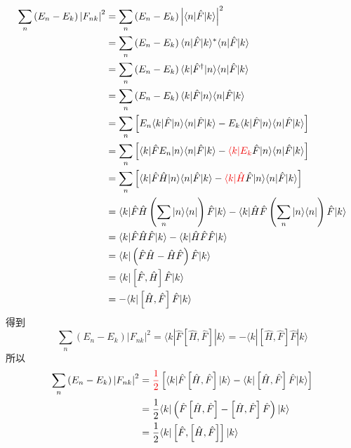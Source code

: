 \begin{equation}
    \begin{aligned}
        \sum_n{\left( E_n-E_k \right) \left| F_{nk} \right|^2}&=\sum_n{\left( E_n-E_k \right) \left| \langle n|\hat{F}|k\rangle \right|^2}
\\
&=\sum_n{\left( E_n-E_k \right) \langle n|\hat{F}|k\rangle ^*\langle n|\hat{F}|k\rangle}
\\
&=\sum_n{\left( E_n-E_k \right) \langle k|\hat{F}^{\dagger}|n\rangle \langle n|\hat{F}|k\rangle}
\\
&=\sum_n{\left( E_n-E_k \right) \langle k|\hat{F}|n\rangle \langle n|\hat{F}|k\rangle}
\\
&=\sum_n{\left[ E_n\langle k|\hat{F}|n\rangle \langle n|\hat{F}|k\rangle -E_k\langle k|\hat{F}|n\rangle \langle n|\hat{F}|k\rangle \right]}
\\
&=\sum_n{\left[ \langle k|\hat{F}E_n|n\rangle \langle n|\hat{F}|k\rangle -{\color[RGB]{240, 0, 0} \langle k|E_k}\hat{F}|n\rangle \langle n|\hat{F}|k\rangle \right]}
\\
&=\sum_n{\left[ \langle k|\hat{F}\hat{H}|n\rangle \langle n|\hat{F}|k\rangle -{\color[RGB]{240, 0, 0} \langle k|\hat{H}}\hat{F}|n\rangle \langle n|\hat{F}|k\rangle \right]}
\\
&=\langle k|\hat{F}\hat{H}\left( \sum_n{|n\rangle \langle n|} \right) \hat{F}|k\rangle -\langle k|\hat{H}\hat{F}\left( \sum_n{|n\rangle \langle n|} \right) \hat{F}|k\rangle
\\
&=\langle k|\hat{F}\hat{H}\hat{F}|k\rangle -\langle k|\hat{H}\hat{F}\hat{F}|k\rangle 
\\
&=\langle k|\left( \hat{F}\hat{H}-\hat{H}\hat{F} \right) \hat{F}|k\rangle 
\\
&=\langle k|\left[ \hat{F},\hat{H} \right] \hat{F}|k\rangle 
\\
&=-\langle k|\left[ \hat{H},\hat{F} \right] \hat{F}|k\rangle 
    \end{aligned}
\end{equation}
得到
\begin{equation}
    \sum_n{\left( E_n-E_k \right) \left| F_{nk} \right|^2}=\langle k|\hat{F}\left[ \hat{H},\hat{F} \right] |k\rangle =-\langle k|\left[ \hat{H},\hat{F} \right] \hat{F}|k\rangle 
\end{equation}
所以
\begin{equation}
    \begin{aligned}
        \sum_n{\left( E_n-E_k \right) \left| F_{nk} \right|^2}&={\color[RGB]{240, 0, 0} \frac{1}{2}}\left[ \langle k|\hat{F}\left[ \hat{H},\hat{F} \right] |k\rangle -\langle k|\left[ \hat{H},\hat{F} \right] \hat{F}|k\rangle \right] 
\\
&=\frac{1}{2}\langle k|\left( \hat{F}\left[ \hat{H},\hat{F} \right] -\left[ \hat{H},\hat{F} \right] \hat{F} \right) |k\rangle 
\\
&=\frac{1}{2}\langle k|\left[ \hat{F},\left[ \hat{H},\hat{F} \right] \right] |k\rangle 
    \end{aligned}
\end{equation}

